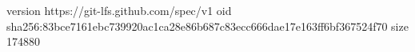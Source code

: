 version https://git-lfs.github.com/spec/v1
oid sha256:83bce7161ebc739920ac1ca28e86b687c83ecc666dae17e163ff6bf367524f70
size 174880
